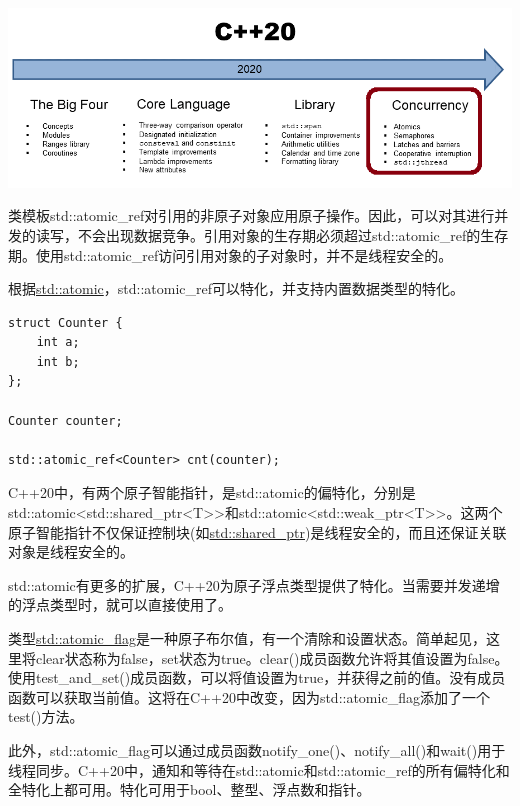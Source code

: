 
\begin{center}
\includegraphics[width=1.0\textwidth]{content/2/chapter3/images/7.png}\\
\end{center}


类模板std::atomic\_ref对引用的非原子对象应用原子操作。因此，可以对其进行并发的读写，不会出现数据竞争。引用对象的生存期必须超过std::atomic\_ref的生存期。使用std::atomic\_ref访问引用对象的子对象时，并不是线程安全的。

根据\href{https://en.cppreference.com/w/cpp/atomic/atomic}{std::atomic}，std::atomic\_ref可以特化，并支持内置数据类型的特化。

\begin{lstlisting}[style=styleCXX]
struct Counter {
	int a;
	int b;
};

Counter counter;

std::atomic_ref<Counter> cnt(counter);
\end{lstlisting}

C++20中，有两个原子智能指针，是std::atomic的偏特化，分别是std::atomic<std::shared\_ptr<T>>和std::atomic<std::weak\_ptr<T>>。这两个原子智能指针不仅保证控制块(如\href{https://en.cppreference.com/w/cpp/memory/shared_ptr}{std::shared\_ptr})是线程安全的，而且还保证关联对象是线程安全的。

std::atomic有更多的扩展，C++20为原子浮点类型提供了特化。当需要并发递增的浮点类型时，就可以直接使用了。

类型\href{https://en.cppreference.com/w/cpp/atomic/atomic_flag}{std::atomic\_flag}是一种原子布尔值，有一个清除和设置状态。简单起见，这里将clear状态称为false，set状态为true。clear()成员函数允许将其值设置为false。使用test\_and\_set()成员函数，可以将值设置为true，并获得之前的值。没有成员函数可以获取当前值。这将在C++20中改变，因为std::atomic\_flag添加了一个test()方法。

此外，std::atomic\_flag可以通过成员函数notify\_one()、notify\_all()和wait()用于线程同步。C++20中，通知和等待在std::atomic和std::atomic\_ref的所有偏特化和全特化上都可用。特化可用于bool、整型、浮点数和指针。

